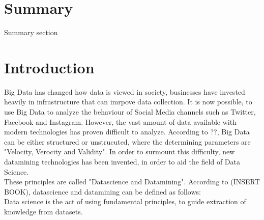 \documentclass{article}
\begin{document}
\color{NavyBlue} \tableofcontents \color{black}
\thispagestyle{empty} %
 \cleardoublepage
\setcounter{page}{1}%


\cleardoublepage%


\section{Summary} %
Summary section


\cleardoublepage %



















\color{NavyBlue} \section{Introduction} \label{sec:intro}

\color {black}

Big Data has changed how data is viewed in society, businesses have  invested heavily in infrastructure that can imrpove data collection.
It is now possible, to use Big Data to analyze the behaviour of Social Media channels such as Twitter, Facebook and Instagram. 
However, the vast amount of data available with modern technologies has proven difficult to analyze. According to ??, Big Data can be either
structured or unstrucuted, where the determining parameters are "Velocity, Verocity and Validity". In order to surmount  this difficulty, new datamining technologies 
has been invented, in order to aid the field of Data Science. \\

These principles are called "Datascience and Datamining". According to (INSERT BOOK), datascience and datamining can be defined as follows: \\

Data science is the act of using fundamental principles, to guide extraction of knowledge from datasets. \\
\end{document}
